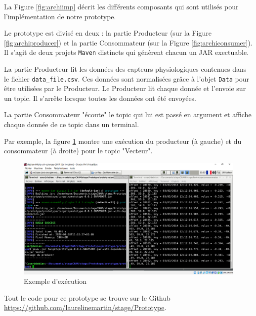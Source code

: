 \documentclass[11pt]{article}
\begin{document}
			La Figure \ref{fig:archiimp} décrit les différents composants qui sont utilisés pour l'implémentation de notre prototype.\par
			Le prototype est divisé en deux :
			la partie Producteur (sur la Figure \ref{fig:archiproducer}) et la partie Consommateur (sur la Figure \ref{fig:archiconsumer}). 
			Il s'agit de deux projets \texttt{Maven} distincts qui génèrent chacun un JAR exectuable.\par
			La partie Producteur lit les données des capteurs physiologiques contenues dans le fichier \texttt{data\_file.csv}. 
			Ces données sont normalisées grâce à l'objet \texttt{Data} pour être utilisées par le Producteur.
			Le Producteur lit chaque donnée et l'envoie sur un topic.
			Il s'arrête lorsque toutes les données ont été envoyées.\par
			La partie Consommateur "écoute" le topic qui lui est passé en argument et affiche chaque donnée de ce topic dans un terminal.\par
			Par exemple, la figure \ref{fig:exemple} montre une exécution du producteur (à gauche) et du consommateur (à droite) pour le topic "Vecteur".
			\begin{figure}
				\hspace*{-0.7cm}
				\includegraphics[scale=0.5]{../include/producteurConsommateur.PNG}
				\caption{Exemple d'exécution}
				\label{fig:exemple}
			\end{figure}\par
			Tout le code pour ce prototype se trouve sur le Github \href{https://github.com/laurelinemartin/stage/Prototype}{https://github.com/laurelinemartin/stage/Prototype}.
\end{document}

